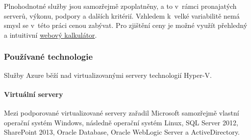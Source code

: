 Plnohodnotné služby jsou samozřejmě zpoplatněny, a to v~rámci pronajatých serverů, výkonu, podpory a dalších kritérií. Vzhledem k~velké variabilitě nemá smysl se v~této práci cenou zabývat. Pro zjištění ceny je možné využít přehledný a intuitivní \href{http://www.windowsazure.com/en-us/pricing/calculator/?scenario=full}{webový kalkulátor}.

\subsubsection{Používané technologie}
Služby Azure běží nad virtualizovanými servery technologií Hyper-V.

\paragraph{Virtuální servery}
Mezi podporované virtualizované servery zařadil Microsoft samozřejmě vlastní operační systém Windows, následně operační systém Linux, SQL Server 2012, SharePoint 2013, Oracle Database, Oracle WebLogic Server a ActiveDirectory.

